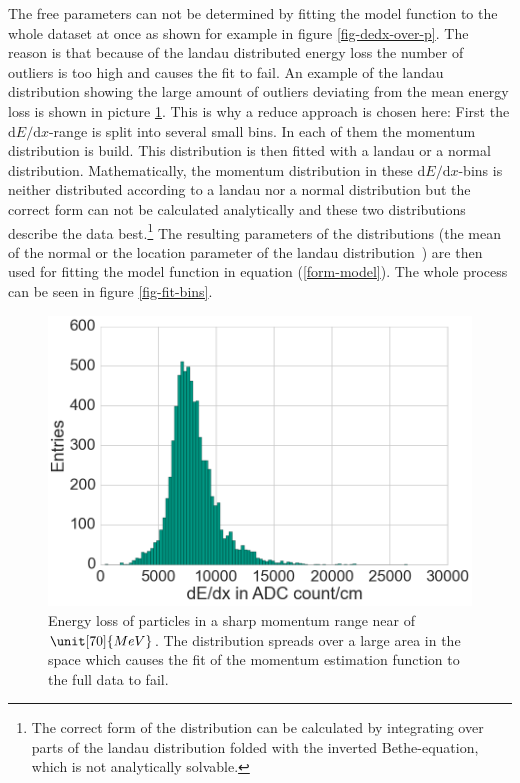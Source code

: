 The free parameters can not be determined by fitting the model function to the whole dataset at once as shown for example in figure \ref{fig-dedx-over-p}. The reason is that because of the landau distributed energy loss the number of outliers is too high and causes the fit to fail. An example of the landau distribution showing the large amount of outliers deviating from the mean energy loss is shown in picture \ref{fig-landau}. This is why a reduce approach is chosen here: First the $\mathrm d E / \mathrm d x$-range is split into several small bins. In each of them the momentum distribution is build. This distribution is then fitted with a landau or a normal distribution. Mathematically, the momentum distribution in these $\mathrm d E / \mathrm d x$-bins is neither distributed according to a landau nor a normal distribution but the correct form can not be calculated analytically and these two distributions describe the data best.\footnote{The correct form of the distribution can be calculated by integrating over parts of the landau distribution folded with the inverted Bethe-equation, which is not analytically solvable.} The resulting parameters of the distributions (the mean of the normal or the location parameter of the landau distribution~\cite{landau}) are then used for fitting the model function in equation (\ref{form-model}). The whole process can be seen in figure \ref{fig-fit-bins}.

\begin{figure}
  \centering
  \includegraphics[width=0.7\linewidth]{figures/vxd/landau.png}
  \caption[Energy loss of particles in a sharp momentum range near of 70 MeV.]{Energy loss of particles in a sharp momentum range near of $\unit[70]{MeV}$. The distribution spreads over a large area in the \dedx space which causes the fit of the momentum estimation function to the full data to fail.}
  \label{fig-landau}
\end{figure}

